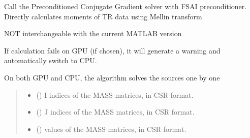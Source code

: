 \documentclass[letterpaper,10pt,english]{sphinxmanual}
\begin{document}
\begin{fulllineitems}
\label{\detokenize{_autosummary/nirfasterff.math.get_field_TRmoments:nirfasterff.math.get_field_TRmoments}}
\pysigstartsignatures
\pysiglinewithargsret
{}
{\sphinxparamcomma {}\sphinxparamcomma {}\sphinxparamcomma {}\sphinxparamcomma {}\sphinxparamcomma {}\sphinxparamcomma {}}
{}
\pysigstopsignatures
\sphinxAtStartPar
Call the Preconditioned Conjugate Gradient solver with FSAI preconditioner. Directly calculates moments of TR data using Mellin transform

\sphinxAtStartPar
NOT interchangeable with the current MATLAB version

\sphinxAtStartPar
If calculation fails on GPU (if chosen), it will generate a warning and automatically switch to CPU.

\sphinxAtStartPar
On both GPU and CPU, the algorithm solves the sources one by one
\begin{quote}\begin{description}
\begin{itemize}
\item {} 
\sphinxAtStartPar
{} (\sphinxstyleliteralemphasis{\sphinxupquote{, }}) \textendash{} I indices of the MASS matrices, in CSR format.

\item {} 
\sphinxAtStartPar
{} (\sphinxstyleliteralemphasis{\sphinxupquote{, }}) \textendash{} J indices of the MASS matrices, in CSR format.

\item {} 
\sphinxAtStartPar
{} () \textendash{} 
\sphinxAtStartPar
values of the MASS matrices, in CSR format.


\end{itemize}
\end{description}
\end{quote}
\end{fulllineitems}
\end{document}
